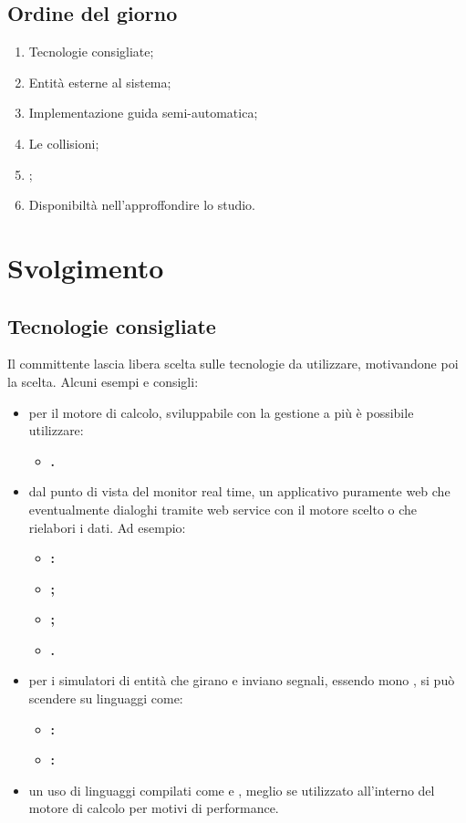 \documentclass[]{article}
\begin{document}
		\subsection{Ordine del giorno}
		\begin{enumerate}
			\item Tecnologie consigliate;
			\item Entità esterne al sistema;
			\item Implementazione guida semi-automatica;
			\item Le collisioni;
			\item {};
			\item Disponibiltà nell'approffondire lo studio.
		\end{enumerate}

	\newpage

	\section{Svolgimento}
		\subsection{Tecnologie consigliate}
	Il committente lascia libera scelta sulle tecnologie da utilizzare, motivandone poi la scelta. Alcuni esempi e consigli:
	\begin{itemize}
		\item per il motore di calcolo, sviluppabile con la gestione a più  è possibile utilizzare:
		\begin{itemize}
			\item \bfseries{}.
		\end{itemize}
		\item dal punto di vista del  monitor real time, un applicativo puramente web che eventualmente dialoghi  tramite web service con il motore scelto o che rielabori i dati. Ad esempio:
		\begin{itemize}
			\item \bfseries{}: 
			\item \bfseries{};
			\item \bfseries{};
			\item \bfseries{}.
		\end{itemize}
		\item 	per i simulatori di entità che girano e inviano segnali, essendo mono , si può scendere su linguaggi come:
		\begin{itemize}
			\item \bfseries{}: 
			\item \bfseries{}: 
		\end{itemize}
		\item 	un uso di linguaggi compilati come  e , meglio se utilizzato all'interno del motore di calcolo per motivi di performance. \\
	\end{itemize}
	
\end{document}
